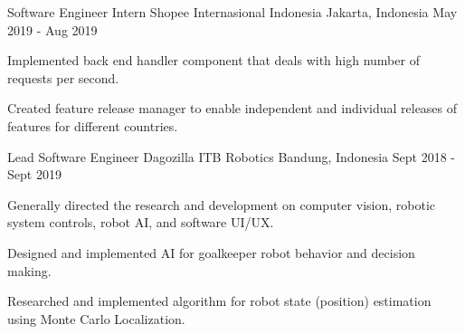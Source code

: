 

\begin{cventries}

  \cventry
    {Software Engineer Intern} %
    {Shopee Internasional Indonesia} %
    {Jakarta, Indonesia} %
    {May 2019 - Aug 2019} %
    {
      \begin{cvitems} %
        \item {Implemented back end handler component that deals with high number of requests per second.}
        \item {Created feature release manager to enable independent and individual releases of features for different countries.}
      \end{cvitems}
    }




  \cventry
	{Lead Software Engineer} %
	{Dagozilla ITB Robotics} %
	{Bandung, Indonesia} %
	{Sept 2018 - Sept 2019} %
	{
	  \begin{cvitems} %
		\item {Generally directed the research and development on computer vision, robotic system controls, robot AI, and software UI/UX.}
		\item {Designed and implemented AI for goalkeeper robot behavior and decision making.}
		\item {Researched and implemented algorithm for robot state (position) estimation using Monte Carlo Localization.}
	  \end{cvitems}
	}



\end{cventries}
